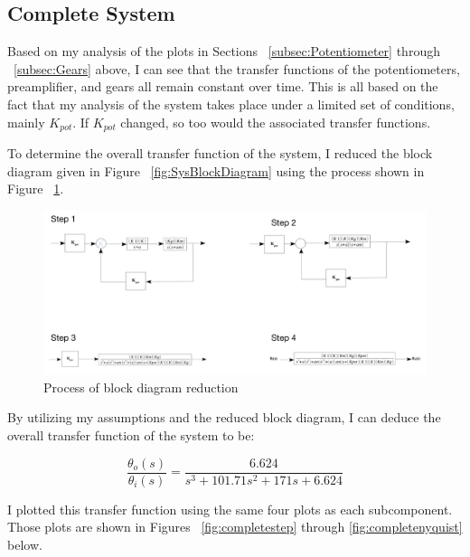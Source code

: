 \documentclass[12pt]{article}
\begin{document}
\subsection{Complete System}

Based on my analysis of the plots in Sections ~\ref{subsec:Potentiometer} through ~\ref{subsec:Gears} above, I can see that the transfer functions of the potentiometers, preamplifier, and gears all remain constant over time. This is all based on the fact that my analysis of the system takes place under a limited set of conditions, mainly $K_{pot}$. If $K_{pot}$ changed, so too would the associated transfer functions.

To determine the overall transfer function of the system, I reduced the block diagram given in Figure ~\ref{fig:SysBlockDiagram} using the process shown in Figure ~\ref{fig:reduction}.

\begin{figure}[H]
\begin{center}
	\includegraphics[width=\textwidth]{./img/BlockDiagramReduction.png}
	\caption{\label{fig:reduction}Process of block diagram reduction}
\end{center}
\end{figure}

By utilizing my assumptions and the reduced block diagram, I can deduce the overall transfer function of the system to be:

\begin{equation}
\frac{\theta_{o}(s)}{\theta_{i}(s)} = \frac{6.624}{s^{3}+101.71s^{2}+171s+6.624}\label{eq:6}
\end{equation}

I plotted this transfer function using the same four plots as each subcomponent. Those plots are shown in Figures ~\ref{fig:completestep} through \ref{fig:completenyquist} below.
\end{document}
